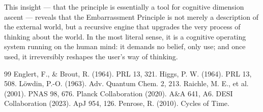\documentclass[10pt,a4paper]{article}
\begin{document}
This insight — that the principle is essentially a tool for cognitive dimension ascent — reveals that the Embarrassment Principle is not merely a description of the external world, but a recursive engine that upgrades the very process of thinking about the world. In the most literal sense, it is a cognitive operating system running on the human mind: it demands no belief, only use; and once used, it irreversibly reshapes the user’s way of thinking.
\begin{thebibliography}{99}
 Englert, F., \& Brout, R. (1964). PRL 13, 321.
 Higgs, P. W. (1964). PRL 13, 508.
 Löwdin, P.-O. (1963). Adv. Quantum Chem. 2, 213.
 Raichle, M. E., et al. (2001). PNAS 98, 676.
 Planck Collaboration (2020). A\&A 641, A6.
 DESI Collaboration (2023). ApJ 954, 126.
 Penrose, R. (2010). Cycles of Time.
\end{thebibliography}
\end{document}

